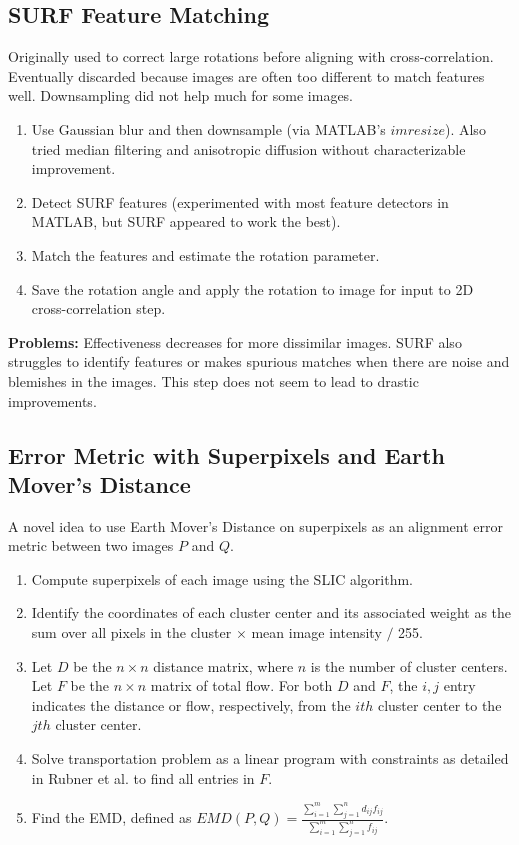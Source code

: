 \documentclass{article}
\begin{document}
\subsection{SURF Feature Matching}
Originally used to correct large rotations before aligning with cross-correlation. Eventually discarded because images are often too different to match features well. Downsampling did not help much for some images.\\
\begin{enumerate}
\item Use Gaussian blur and then downsample (via MATLAB's $imresize$). Also tried median filtering and anisotropic diffusion without characterizable improvement.
\item Detect SURF features (experimented with most feature detectors in MATLAB, but SURF appeared to work the best). 
\item Match the features and estimate the rotation parameter.
\item Save the rotation angle and apply the rotation to image for input to 2D cross-correlation step.
\end{enumerate}
\textbf{Problems:} Effectiveness decreases for more dissimilar images. SURF also struggles to identify features or makes spurious matches when there are noise and blemishes in the images. This step does not seem to lead to drastic improvements. \\
\subsection{Error Metric with Superpixels and Earth Mover's Distance}
A novel idea to use Earth Mover's Distance on superpixels as an alignment error metric between two images $P$ and $Q$.
\begin{enumerate}
\item Compute superpixels of each image using the SLIC algorithm.
\item Identify the coordinates of each cluster center and its associated weight as the sum over all pixels in the cluster $\times$ mean image intensity $/$ 255. 
\item Let $D$ be the $n \times n$ distance matrix, where $n$ is the number of cluster centers. Let $F$ be the $n \times n$ matrix of total flow. For both $D$ and $F$, the $i,j$ entry indicates the distance or flow, respectively, from the $ith$ cluster center to the $jth$ cluster center. 
\item Solve transportation problem as a linear program with constraints as detailed in Rubner et al. \cite{rubner00} to find all entries in $F$.
\item Find the EMD, defined as $EMD(P,Q) = \frac{ \sum_{i=1}^m \sum_{j=1}^n d_{ij} f_{ij} } { \sum_{i=1}^m \sum_{j=1}^n f_{ij} }$.
\end{enumerate}
\end{document}
